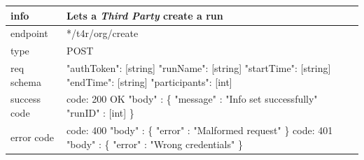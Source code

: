 \documentclass[titlepage]{article}
\begin{document}
\begin{tabularx}{\textwidth}{lX} \hline
    info & Lets a {\it Third Party} create a run \\ \hline
    endpoint & */t4r/org/create \\ \hline
    type & POST \\ \hline
    req schema &  
    "authToken": [string] \newline
    "runName": [string] \newline
    "startTime": [string] \newline
    "endTime": [string] \newline
    "participants": [int] \\ \hline
    success code &
        code: 200 OK \newline  
        "body" : \{ \newline
        "message" : "Info set successfully" \newline
        "runID" : [int] \newline
        \} \\ \hline
    error code &
        code: 400 \newline
        "body" : \{ "error" : "Malformed request" \} \newline \newline
        code: 401 \newline
        "body" : \{ "error" : "Wrong credentials" \} \\ \hline
\end{tabularx}
		
\end{document}
